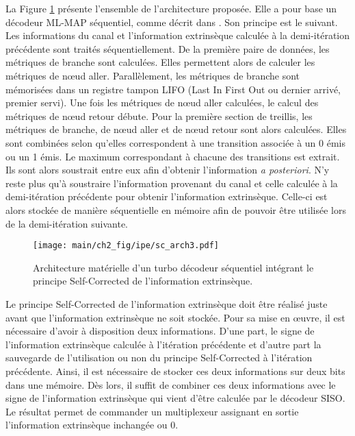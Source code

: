 La Figure \ref{fig:sc_arch} présente l'ensemble de l'architecture proposée. Elle a pour base un décodeur ML-MAP séquentiel, 
comme décrit dans \cite{livre_declercq}. Son principe est le suivant. Les 
informations du canal et l'information extrinsèque calculée à la demi-itération précédente sont traités séquentiellement. De 
la première paire de données, les métriques de branche sont calculées. Elles permettent alors de calculer les métriques 
de nœud aller. Parallèlement, les métriques de branche sont mémorisées dans un registre tampon LIFO (Last In First Out ou 
dernier arrivé, premier servi). Une fois les métriques de nœud aller calculées, le calcul des métriques de nœud retour débute. 
Pour la première section de treillis, les métriques de branche, de nœud aller et de nœud retour sont alors calculées. 
Elles sont combinées selon qu'elles correspondent à une transition associée à un 0 émis ou un 1 émis. Le maximum 
correspondant à chacune des transitions est extrait. Ils sont alors soustrait entre eux afin d'obtenir l'information \textit{a posteriori}. N'y reste plus qu'à soustraire l'information provenant du canal et celle calculée à la demi-itération 
précédente pour obtenir l'information extrinsèque. Celle-ci est alors stockée de manière séquentielle en mémoire afin 
de pouvoir être utilisée lors de la demi-itération suivante.

\begin{figure}[!t]
	\centering
	\texttt{[image: main/ch2\_fig/ipe/sc\_arch3.pdf]}
	\vspace*{.3cm}
	\caption{\label{fig:sc_arch}Architecture matérielle d'un turbo décodeur séquentiel intégrant le principe Self-Corrected de l'information 
	extrinsèque.}
\end{figure}

Le principe Self-Corrected de l’information extrinsèque doit être réalisé juste avant que l'information extrinsèque ne soit stockée. 
Pour sa mise en œuvre, il est nécessaire d'avoir à disposition deux informations. D'une part, le signe de l'information 
extrinsèque calculée à l'itération précédente et d'autre part la sauvegarde de l'utilisation ou non du principe Self-Corrected à 
l'itération précédente. Ainsi, il est nécessaire de stocker ces deux informations sur deux bits dans une mémoire. Dès lors, 
il suffit de combiner ces deux informations avec le signe de l'information extrinsèque qui vient d'être 
calculée par le décodeur SISO. Le résultat permet de commander un multiplexeur assignant en sortie l'information extrinsèque 
inchangée ou 0.

